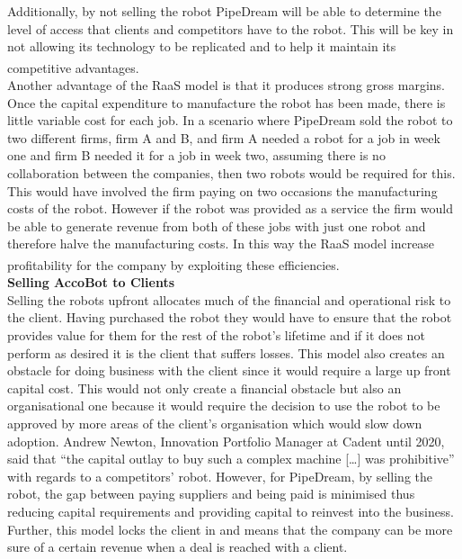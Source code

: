 \documentclass[11pt]{article}		%
\newcommand{\supercite}[1]{\textsuperscript{\cite{#1}}}		%
\begin{document}
            Additionally, by not selling the robot PipeDream will be able to determine the level of access that clients and competitors have to the robot. This will be key in not allowing its technology to be replicated and to help it maintain its competitive advantages.\supercite{Barney}
            \\Another advantage of the RaaS model is that it produces strong gross margins.
            Once the capital expenditure to manufacture the robot has been made, there is little variable cost for each job. In a scenario where PipeDream sold the robot to two different firms, firm A and B, and  firm A needed a robot for a job in week one and  firm B needed it for a job in week two, assuming there is no collaboration between the companies, then two robots would be required for this. This would have involved the firm paying on two occasions the manufacturing costs of the robot. However if the robot was provided as a service the firm would be able to generate revenue from both of these jobs with just one robot and therefore halve the manufacturing costs. In this way the RaaS model increase profitability for the company by exploiting these efficiencies.  \supercite{monetise_RaaS}
            \\
            \textbf{Selling AccoBot to Clients}
            \\
            Selling the robots upfront allocates much of the financial and operational risk to the client. Having purchased the robot they would have to ensure that the robot provides value for them for the rest of the robot's lifetime and if it does not perform as desired it is the client that suffers losses. This model also creates an obstacle for doing business with the client since it would require a large up front capital cost. This would not only create a financial obstacle but also an organisational one because it would require the decision to use the robot to be approved by more areas of the client’s organisation which would slow down adoption. Andrew Newton, Innovation Portfolio Manager at Cadent until 2020, said that “the capital outlay to buy such a complex machine […] was prohibitive” with regards to a competitors’ robot. However, for PipeDream, by selling the robot, the gap between paying suppliers and being paid is minimised thus reducing capital requirements and providing capital to reinvest into the business. Further, this model locks the client in and means that the company can be more sure of a certain revenue when a deal is reached with a client.  
            \\
\end{document}
